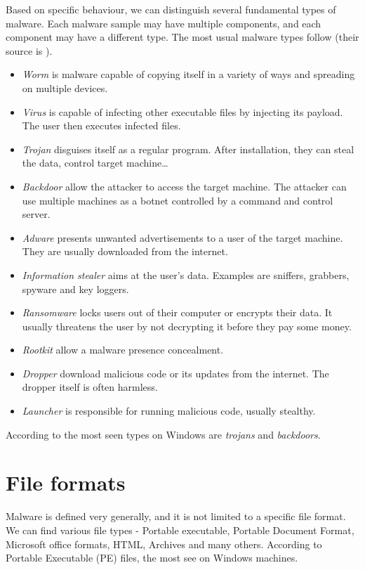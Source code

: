 Based on specific behaviour, we can distinguish several fundamental types of malware. Each malware sample may have multiple components, and each component may have a different type. The most usual malware types follow (their source is \cite{Cole2009, KA2018, Graham2010, Sikorski2012}).
\begin{itemize}
  \itemsep0em 
  \item \emph{Worm} is malware capable of copying itself in a variety of ways and spreading on multiple devices.
  \item \emph{Virus} is capable of infecting other executable files by injecting its payload. The user then executes infected files.
  \item \emph{Trojan} disguises itself as a regular program. After installation, they can steal the data, control target machine\dots
  \item \emph{Backdoor} allow the attacker to access the target machine. The attacker can use multiple machines as a botnet controlled by a command and control server.
  \item \emph{Adware} presents unwanted advertisements to a user of the target machine. They are usually downloaded from the internet.
  \item \emph{Information stealer} aims at the user's data. Examples are sniffers, grabbers, spyware and key loggers.
  \item \emph{Ransomware} locks users out of their computer or encrypts their data. It usually threatens the user by not decrypting it before they pay some money.
  \item \emph{Rootkit} allow a malware presence concealment.
  \item \emph{Dropper} download malicious code or its updates from the internet. The dropper itself is often harmless.
  \item \emph{Launcher} is responsible for running malicious code, usually stealthy.
\end{itemize}

According to \cite{AVATLASM39:online} the most seen types on Windows are \emph{trojans} and \emph{backdoors}.

\section{File formats}
Malware is defined very generally, and it is not limited to a specific file format. We can find various file types - Portable executable, Portable Document Format, Microsoft office formats, HTML, Archives and many others. According to \cite{AVATLASM39:online} Portable Executable (PE) files, the most see on Windows machines.

